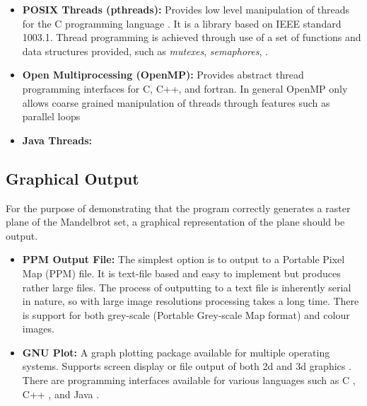 \begin{itemize}
\item \textbf{POSIX Threads (pthreads):} Provides low level manipulation of threads for the C programming language \cite{pthreadover}. 
              It is a library based on IEEE standard 1003.1. Thread programming is achieved through use of a set of functions and data
              structures provided, such as \textit{mutexes}, \textit{semaphores}, \textit{ }. %
             
\item \textbf{Open Multiprocessing (OpenMP):} Provides abstract thread programming interfaces for C, C++, and fortran.
              In general OpenMP only allows coarse grained manipulation of threads through features such as parallel loops %
              \cite{ompvspthr}

\item \textbf{Java Threads:}
\end{itemize}

\subsection*{Graphical Output}
For the purpose of demonstrating that the program correctly generates a raster plane
of the Mandelbrot set, a graphical representation of the plane should be output.

\begin{itemize}
\item \textbf{PPM Output File:} The simplest option is to output to a Portable Pixel Map (PPM) file. It is 
              text-file based and easy to implement but produces rather large files. 
              The process of outputting to a text file is inherently serial in nature,
              so with large image resolutions processing takes a long time.
              There is support for both grey-scale (Portable Grey-scale Map format) and colour images. 
              \cite{ppmspec}
              
\item \textbf{GNU Plot:} A graph plotting package available for multiple operating systems. 
              Supports screen display or file output of both 2d and 3d graphics \cite{gnuplot}.
              There are programming interfaces available for various languages such as C \cite{gnuplotcint}, C++ \cite{gnuplotcppint}, 
              and Java \cite{gnuplotjint}.
              
\end{itemize}
